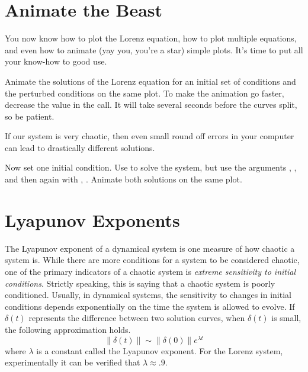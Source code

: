 \section*{Animate the Beast}
You now know how to plot the Lorenz equation, how to plot multiple equations, and even how to animate (yay you, you're a star) simple plots.
It's time to put all your know-how to good use.

\begin{problem}
Animate the solutions of the Lorenz equation for an initial set of conditions and the perturbed conditions on the same plot.
To make the animation go faster, decrease the  value in the  call.
It will take several seconds before the curves split, so be patient.
\end{problem}

If our system is very chaotic, then even small round off errors in your computer can lead to drastically different solutions.

\begin{problem}
Now set one initial condition.
Use  to solve the system, but use the arguments , , and then again with , .
Animate both solutions on the same plot.
\end{problem}

\section*{Lyapunov Exponents}
The Lyapunov exponent of a dynamical system is one measure of how chaotic a system is.
While there are more conditions for a system to be considered chaotic, one of the primary indicators of a chaotic system is \emph{extreme sensitivity to initial conditions}.
Strictly speaking, this is saying that a chaotic system is poorly conditioned.
Usually, in dynamical systems, the sensitivity to changes in initial conditions depends exponentially on the time the system is allowed to evolve.
If $\delta(t)$ represents the difference between two solution curves, when $\delta(t)$ is small, the following approximation holds.
\[\|\delta(t)\| \sim \|\delta(0)\| e^{\lambda t}\]
where $\lambda$ is a constant called the Lyapunov exponent.
For the Lorenz system, experimentally it can be verified that $\lambda \approx .9$.

